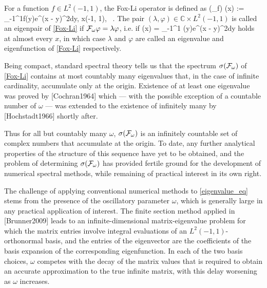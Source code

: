 For a function $f \in L^2(-1, 1)$, the Fox-Li operator is defined as
\be \label{Fox-Li}
(\F_\omega f) (x) := \int_{-1}^1f(y)e^{\im\omega(x - y)^2}dy, \quad x\in(-1, 1), \ \omega{}.
\ee
The pair $(\lambda, \varphi)\in\mathbb{C}\times L^2(-1, 1)$ is called an eigenpair of \eqref{Fox-Li} if $\mathcal{F}_\omega \varphi = \lambda\varphi$, i.e. if
\be\label{eigenvalue_eq}
	\lambda\varphi(x) = \lambda\int_{-1}^1 \varphi(y)e^{\im\omega(x - y)^2}dy
\ee
holds at almost every $x$, in which case $\lambda$ and $\varphi$ are called an eigenvalue and eigenfunction of \eqref{Fox-Li} respectively.

Being compact, standard spectral theory tells us that the spectrum $\sigma(\mathcal{F}_\omega)$ of \eqref{Fox-Li} contains at most countably many eigenvalues that, in the case of infinite cardinality, accumulate only at the origin. Existence of at least one eigenvalue was proved by [Cochran1964] which --- with the possible exception of a countable number of $\omega$ --- was extended to the existence of infinitely many by [Hochstadt1966] shortly after.

Thus for all but countably many $\omega$, $\sigma(\mathcal{F}_\omega)$ is an infinitely countable set of complex numbers that accumulate at the origin. To date, any further analytical properties of the structure of this sequence have yet to be obtained, and the problem of determining $\sigma(\mathcal{F}_\omega)$ has provided fertile ground for the development of numerical spectral methods, while remaining of practical interest in its own right.

The challenge of applying conventional numerical methods to \eqref{eigenvalue_eq} stems from the presence of the oscillatory parameter $\omega$, which is generally large in any practical application of interest. The finite section method applied in [Brunner2009] leads to an infinite-dimensional matrix-eigenvalue problem for which the matrix entries involve integral evaluations of an $L^2(-1, 1)$-orthonormal basis, and the entries of the eigenvector are the coefficients of the basis expansion of the corresponding eigenfunction. In each of the two basis choices, $\omega$ competes with the decay of the matrix values that is required to obtain an accurate approximation to the true infinite matrix, with this delay worsening as $\omega$ increases.

